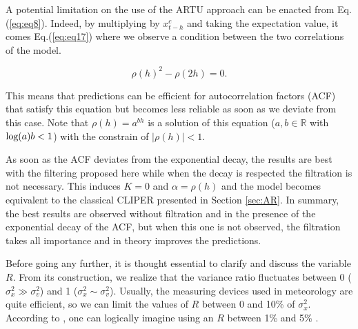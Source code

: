 A potential limitation on the use of the ARTU approach can be enacted from Eq.(\ref{eq:eq8}). Indeed, by multiplying by $x^c_{t-h}$ and taking the expectation value, it comes Eq.(\ref{eq:eq17}) where we observe a condition between the two correlations of the model.

\begin{equation}
\label{eq:eq17}
\rho(h)^2-\rho(2h)=0.
\end{equation}

This means that predictions can be efficient for autocorrelation factors (ACF) that satisfy this equation but becomes less reliable as soon as we deviate from this case. Note that $\rho(h)=a^{bh}$ is a solution of this equation ($a,b\in\mathbb{R}$ with $ \textnormal{log}(a)b<1$) with the constrain of  $\lvert\rho(h)\rvert<1$. 

As soon as the ACF deviates from the exponential decay, the results are best with the filtering proposed here while when the decay is respected the filtration is not necessary. This induces $K=0$ and $\alpha=\rho(h)$ and the model becomes equivalent to the classical CLIPER presented in Section \ref{sec:AR}. In summary, the best results are observed without filtration and in the presence of the exponential decay of the ACF, but when this one is not observed, the filtration takes all importance and in theory  improves the predictions.

Before going any further, it is thought essential to clarify and discuss the variable $R$. From its construction, we realize that the variance ratio fluctuates between 0 ($ \sigma_x ^ 2  \gg \sigma^2_{v}$) and 1 ($ \sigma_x ^ 2  \sim \sigma^2_{v}$). Usually, the measuring devices used in meteorology are quite efficient, so we can limit the values of $ R $ between $ 0 $ and 10\% of $ \sigma _x ^ 2 $. According to \citet{vuilleumier2017}, one can logically imagine using an $ R $ between 1\% and 5\% . 

